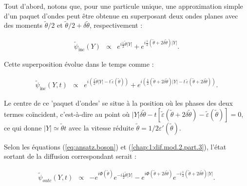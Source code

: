 Tout d'abord, notons que, pour une particule unique, une approximation simple d’un paquet d’ondes peut être obtenue en superposant deux ondes planes avec des moments $\tilde{\theta}/2$ et $\tilde{\theta}/2 + \delta \tilde{\theta}$, respectivement :

\begin{eqnarray}
	\tilde{\psi}_{\text{inc}}(Y) & \propto & e^{i\frac{1}{2}\tilde{\theta} \vert Y\vert} + e^{i\frac{1}{2}\left(\tilde{\theta} + 2\delta \tilde{\theta} \right) \vert Y\vert}.
\end{eqnarray}

Cette superposition évolue dans le temps comme :

\begin{eqnarray}
\tilde{\psi}_{\text{inc}}(Y, t) &\propto &  e^{i\left( \frac{1}{2} \tilde{\theta}\vert Y\vert - t\,\tilde{\varepsilon}(\tilde{\theta}) \right)} + e^{i\left( \frac{1}{2}\left(  \tilde{\theta} + 2\delta \tilde{\theta} \right) \vert Y\vert - t\,\tilde{\varepsilon}(\tilde{\theta} + 2\delta \tilde{\theta}) \right)}.
\end{eqnarray}


Le centre de ce 'paquet d'ondes' se situe à la position où les phases des deux termes coïncident, c'est-à-dire au point où $\vert Y\vert\delta \tilde{\theta}  - t[\tilde{\varepsilon}(\tilde{\theta} + 2\delta \tilde{\theta} ) - \tilde{\varepsilon}(\tilde{\theta})] = 0$, ce qui donne $\vert Y\vert \simeq \tilde{\theta} t$ avec la vitesse réduite $\tilde{\theta} = 1/2 \varepsilon'(\tilde{\theta}) $. %

Selon les équations (\ref{eq:ansatz.boson}) et (\ref{chap:1:dif.mod.2.part.3}), l'état sortant de la diffusion correspondant serait :

\begin{eqnarray}
	\tilde{\psi}_{outc} ( Y, t ) & \propto & -e^{i\Phi(\tilde{\theta})}e^{-i\frac{1}{2}\tilde{\theta} \vert Y\vert} - e^{i\Phi(\tilde{\theta} + 2 \delta \tilde{\theta} )}e^{-i\frac{1}{2}\left(\tilde{\theta} + 2\delta \tilde{\theta} \right) \vert Y\vert}. %
\end{eqnarray}

